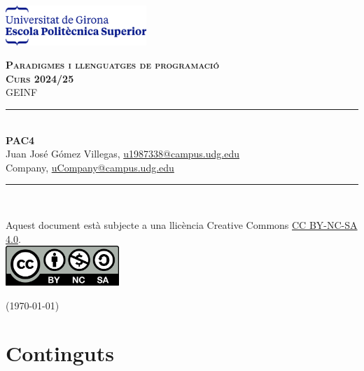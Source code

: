 \documentclass[10pt,a4paper]{article}
\begin{document}
    \begin{titlepage}
        \newcommand{\HRule}{\rule{\linewidth}{0.5mm}} %
        \begin{flushleft}
            \includegraphics[height=1.5cm]{EPS.png}\\\vfill
        \end{flushleft}
        \center %
        \textsc{\huge \bfseries Paradigmes i llenguatges de programació }\\[0.25cm]
        \textsc{\Large \bfseries Curs 2024/25}\\[0.25cm]
        \textsc{\large GEINF }
        \HRule \\[0.4cm]
        { \huge \bfseries PAC4} \\[0.4cm] %
{Juan José Gómez Villegas, \href{mailto:u1987338@campus.udg.edu}{u1987338@campus.udg.edu}} \\ {Company, \href{mailto:uCompany@campus.udg.edu}{uCompany@campus.udg.edu}}
        \HRule \\\vfill
        \begin{minipage}{0.4\textwidth}
            \begin{flushleft}
		\footnotesize{Aquest document està subjecte a una llicència Creative Commons \href{https://creativecommons.org/licenses/by-nc-sa/4.0/?ref=chooser-v1}{CC BY-NC-SA 4.0}.} \\\vfill
		\includegraphics[height=1.5cm]{CC_license.png}
            \end{flushleft}
        \end{minipage}
        \hfill
        \begin{minipage}{0.4\textwidth}
            \begin{flushright} \large
                {\small (\today)}
            \end{flushright}
        \end{minipage}
    \end{titlepage}


\tableofcontents

\clearpage

\section{Continguts}
\end{document}
